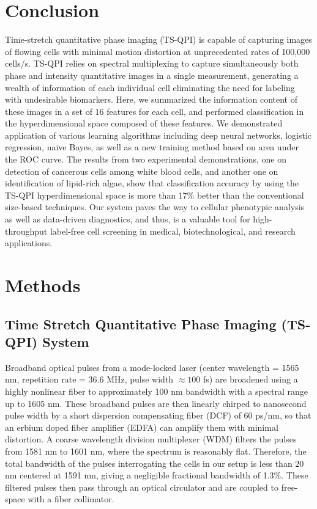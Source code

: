 \documentclass[aps,pra,reprint,superscriptaddress]{revtex4-1}
\begin{document}
\section*{Conclusion}

Time-stretch quantitative phase imaging (TS-QPI) is capable of capturing images of flowing cells with minimal motion distortion at unprecedented rates of 100,000 cells/s. TS-QPI relies on spectral multiplexing to capture simultaneously both phase and intensity quantitative images in a single measurement, generating a wealth of information of each individual cell eliminating the need for labeling with undesirable biomarkers. Here, we summarized the information content of these images in a set of 16 features for each cell, and performed classification in the hyperdimensional space composed of these features. We demonstrated application of various learning algorithms including deep neural networks, logistic regression, naive Bayes, as well as a new training method based on area under the ROC curve. The results from two experimental demonstrations, one on detection of cancerous cells among white blood cells, and another one on identification of lipid-rich algae, show that classification accuracy by using the TS-QPI hyperdimensional space is more than 17\% better than the conventional size-based techniques. Our system paves the way to cellular phenotypic analysis as well as data-driven diagnostics, and thus, is a valuable tool for high-throughput label-free cell screening in medical, biotechnological, and research applications.

\section*{\label{scn:Methods} Methods}

\subsection*{Time Stretch Quantitative Phase Imaging (TS-QPI) System}

Broadband optical pulses from a mode-locked laser (center wavelength = 1565 nm, repetition rate = 36.6 MHz, pulse width $\approx100$ fs) are broadened using a highly nonlinear fiber to approximately 100 nm bandwidth with a spectral range up to 1605 nm. These broadband pulses are then linearly chirped to nanosecond pulse width by a short dispersion compensating fiber (DCF) of 60 ps/nm, so that an erbium doped fiber amplifier (EDFA) can amplify them with minimal distortion. A coarse wavelength division multiplexer (WDM) filters the pulses from 1581 nm to 1601 nm, where the spectrum is reasonably flat. Therefore, the total bandwidth of the pulses interrogating the cells in our setup is less than 20 nm centered at 1591 nm, giving a negligible fractional bandwidth of 1.3\%. These filtered pulses then pass through an optical circulator and are coupled to free-space with a fiber collimator.
\end{document}

